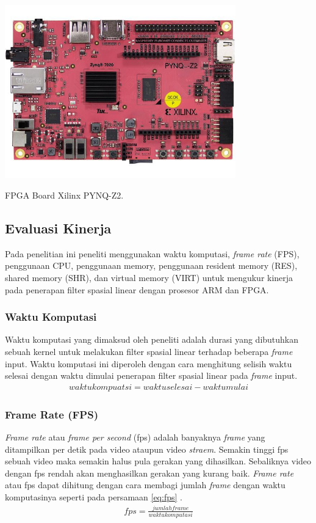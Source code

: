 \begin{afigure}
    \includegraphics[width=10cm, center]{images/pynq-z2.jpeg}
    \caption{FPGA Board Xilinx PYNQ-Z2.}
    \label{fig:pynq-z2}
\end{afigure}


\subsection{Evaluasi Kinerja}
Pada penelitian ini peneliti menggunakan waktu komputasi, \textit{frame rate} (FPS), penggunaan CPU, penggunaan {memory}, penggunaan {resident memory} (RES), {shared memory} (SHR), dan {virtual memory} (VIRT) untuk mengukur kinerja pada penerapan filter spasial linear dengan prosesor ARM dan FPGA.

\subsubsection{Waktu Komputasi}
Waktu komputasi yang dimaksud oleh peneliti adalah durasi yang dibutuhkan sebuah kernel untuk melakukan filter spasial linear terhadap beberapa \textit{frame} input. Waktu komputasi ini diperoleh dengan cara menghitung selisih waktu selesai dengan waktu dimulai penerapan filter spasial linear pada \textit{frame} input.
\begin{equation}
    \label{eq:time}
    \begin{split}
waktu kompuatsi = waktu selesai - waktu mulai
    \end{split}
\end{equation}

\subsubsection{Frame Rate (FPS)}
\textit{Frame rate} atau \textit{frame per second} (fps) adalah banyaknya \textit{frame} yang ditampilkan per detik pada video ataupun video \textit{straem}. Semakin tinggi fps sebuah video maka semakin halus pula gerakan yang dihasilkan. Sebaliknya video dengan fps rendah akan menghasilkan gerakan yang kurang baik. \textit{Frame rate} atau fps dapat dihitung dengan cara membagi jumlah \textit{frame} dengan waktu komputasinya seperti pada persamaan \ref{eq:fps} \cite{pdf:pavan}.
\begin{equation}
    \label{eq:fps}
    \begin{split}
fps = \frac{jumlah frame}{waktu komputasi}
    \end{split}
\end{equation}


